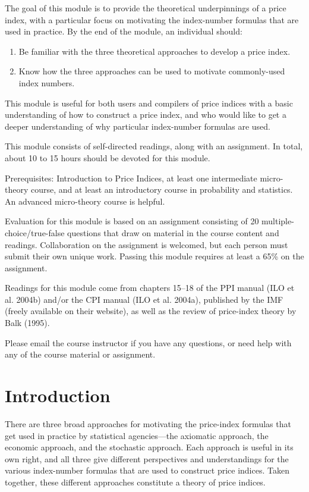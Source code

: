\documentclass[]{article}
\begin{document}
The goal of this module is to provide the theoretical underpinnings of a price index, with a particular focus on motivating the index-number formulas that are used in practice. By the end of the module, an individual should:

\begin{enumerate}
\def\labelenumi{\arabic{enumi}.}
\item
  Be familiar with the three theoretical approaches to develop a price index.
\item
  Know how the three approaches can be used to motivate commonly-used index numbers.
\end{enumerate}

This module is useful for both users and compilers of price indices with a basic understanding of how to construct a price index, and who would like to get a deeper understanding of why particular index-number formulas are used.

This module consists of self-directed readings, along with an assignment. In total, about 10 to 15 hours should be devoted for this module.

Prerequisites: Introduction to Price Indices, at least one intermediate micro-theory course, and at least an introductory course in probability and statistics. An advanced micro-theory course is helpful.

Evaluation for this module is based on an assignment consisting of 20 multiple-choice/true-false questions that draw on material in the course content and readings. Collaboration on the assignment is welcomed, but each person must submit their own unique work. Passing this module requires at least a 65\% on the assignment.

Readings for this module come from chapters 15--18 of the PPI manual (ILO et al. 2004b) and/or the CPI manual (ILO et al. 2004a), published by the IMF (freely available on their website), as well as the review of price-index theory by Balk (1995).

Please email the course instructor if you have any questions, or need help with any of the course material or assignment.

\hypertarget{introduction}{%
\section{Introduction}\label{introduction}}

There are three broad approaches for motivating the price-index formulas that get used in practice by statistical agencies---the axiomatic approach, the economic approach, and the stochastic approach. Each approach is useful in its own right, and all three give different perspectives and understandings for the various index-number formulas that are used to construct price indices. Taken together, these different approaches constitute a theory of price indices.
\end{document}
